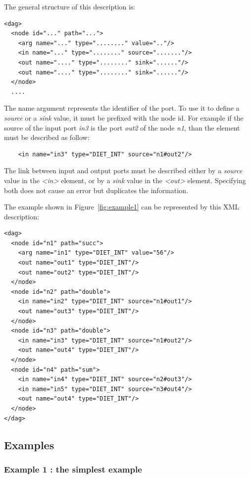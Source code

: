 The general structure of this description is:

\begin{verbatim}
<dag>
  <node id="..." path="...">
    <arg name="..." type="........" value=".."/>
    <in name="..." type="........" source="......."/>
    <out name="...." type="........" sink="......"/>
    <out name="...." type="........" sink="......"/>
  </node>
  ....
\end{verbatim}

The name argument represents the identifier of the port. To use it to
define a \textit{source} or a \textit{sink} value, it must be prefixed
with the node id. For example if the source of the input port
\textit{in3} is the port \textit{out2} of the node \textit{n1}, than
the element must be described as follow:

\begin{verbatim}
    <in name="in3" type="DIET_INT" source="n1#out2"/>
\end{verbatim}

The link between input and output ports must be described either by
a \textit{source} value in the \textit{<in>} element, or by a
\textit{sink} value in the \textit{<out>} element. Specifying both
does not cause an error but duplicates the information.

The example shown in Figure~\ref{fig:example1} can be represented by
this XML description:

\begin{verbatim}
<dag>
  <node id="n1" path="succ">
    <arg name="in1" type="DIET_INT" value="56"/>
    <out name="out1" type="DIET_INT"/>
    <out name="out2" type="DIET_INT"/>
  </node>
  <node id="n2" path="double">
    <in name="in2" type="DIET_INT" source="n1#out1"/>
    <out name="out3" type="DIET_INT"/>
  </node>
  <node id="n3" path="double">
    <in name="in3" type="DIET_INT" source="n1#out2"/>
    <out name="out4" type="DIET_INT"/>
  </node>
  <node id="n4" path="sum">
    <in name="in4" type="DIET_INT" source="n2#out3"/>
    <in name="in5" type="DIET_INT" source="n3#out4"/>
    <out name="out4" type="DIET_INT"/>
  </node>
</dag>
\end{verbatim}

\subsection{Examples}
\label{sec:examples}


\subsubsection{Example 1 : the simplest example}
\label{sec:ex1}

